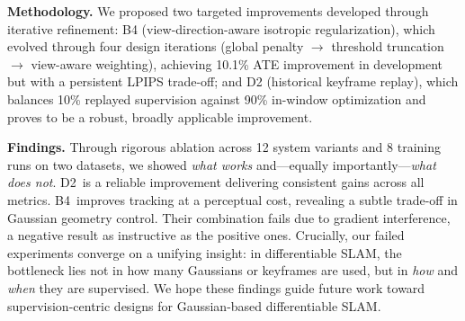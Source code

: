 \documentclass[conference]{IEEEtran}
\begin{document}
\textbf{Methodology.}
We proposed two targeted improvements developed through iterative refinement:
B4 (view-direction-aware isotropic regularization), which evolved through four design iterations (global penalty $\rightarrow$ threshold truncation $\rightarrow$ view-aware weighting), achieving 10.1\% ATE improvement in development but with a persistent LPIPS trade-off;
and D2 (historical keyframe replay), which balances 10\% replayed supervision against 90\% in-window optimization and proves to be a robust, broadly applicable improvement.

\textbf{Findings.}
Through rigorous ablation across 12 system variants and 8 training runs on two datasets, we showed \textit{what works} and---equally importantly---\textit{what does not}.
{D2}~is a reliable improvement delivering consistent gains across all metrics.
{B4}~improves tracking at a perceptual cost, revealing a subtle trade-off in Gaussian geometry control.
Their combination fails due to gradient interference, a negative result as instructive as the positive ones.
Crucially, our failed experiments converge on a unifying insight: in differentiable SLAM, the bottleneck lies not in how many Gaussians or keyframes are used, but in \textit{how} and \textit{when} they are supervised.
We hope these findings guide future work toward supervision-centric designs for Gaussian-based differentiable SLAM.
\end{document}
